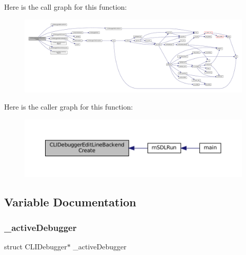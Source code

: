 Here is the call graph for this function\+:
\nopagebreak
\begin{figure}[H]
\begin{center}
\leavevmode
\includegraphics[width=350pt]{cli-el-backend_8c_aea9ca36da1b56d3b608e61aba06b9044_cgraph}
\end{center}
\end{figure}
Here is the caller graph for this function\+:
\nopagebreak
\begin{figure}[H]
\begin{center}
\leavevmode
\includegraphics[width=350pt]{cli-el-backend_8c_aea9ca36da1b56d3b608e61aba06b9044_icgraph}
\end{center}
\end{figure}


\subsection{Variable Documentation}
\mbox{\label{cli-el-backend_8c_aad6d36371c8ad26b4c9a901bafa8d03c}} 
\subsubsection{\texorpdfstring{\+\_\+active\+Debugger}{\_activeDebugger}}
{\footnotesize\ttfamily struct C\+L\+I\+Debugger$\ast$ \+\_\+active\+Debugger\hspace{0.3cm}{\ttfamily [static]}}

